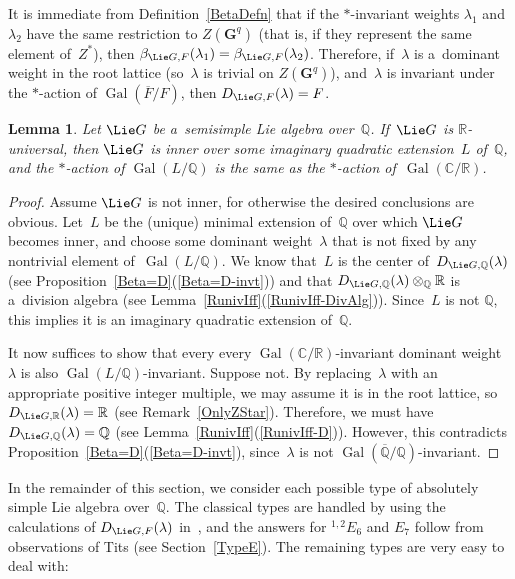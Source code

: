 \documentclass[pdftex]{sigma}
\DeclareMathOperator{\Gal}{Gal}
\numberwithin{equation}{section}
\newtheorem{lem}[prop]{Lemma}
{\theoremstyle{definition}
\newtheorem{defn}[prop]{Definition}
\newtheorem{notation}[prop]{Notation}
\newtheorem{rem}[prop]{Remark}
\newtheorem{ques}[prop]{Question}
\newtheorem{eg}[prop]{Example}
\newtheorem{erratum}[prop]{Erratum}}
\begin{document}
\begin{rem}
\label{OnlyZStar}
It is immediate from Def\/inition~\ref{BetaDefn} that if the $*$-invariant weights $\lambda_1$ and $\lambda_2$ have the same
restriction to $Z(\mathbf{G}^q)$ (that is, if they represent the same element of~$Z^*$), then $\beta_{\Lie G,
F}(\lambda_1) = \beta_{\Lie G, F}(\lambda_2)$.
Therefore, if~$\lambda$ is a~dominant weight in the root lattice (so~$\lambda$ is trivial on $Z(\mathbf{G}^q)$),
and~$\lambda$ is invariant under the $*$-action of $\Gal(\overline{F}/F)$, then $D_{\Lie G, F}(\lambda) = F$.
\end{rem}

\begin{lem}
\label{SameFixed}
Let  $\Lie G$ be a~semisimple Lie algebra over~$\mathbb{Q}$.
If~$\Lie G$ is $\mathbb{R}$-universal, then $\Lie G$ is inner over some imaginary quadratic extension~$L$
of~$\mathbb{Q}$, and the $*$-action of $\Gal(L/\mathbb{Q})$ is the same as the $*$-action of~$\Gal(\mathbb{C}/\mathbb{R})$.
\end{lem}

\begin{proof}
Assume $\Lie G$ is not inner, for otherwise the desired conclusions are obvious.
Let~$L$ be the (unique) minimal extension of~$\mathbb{Q}$ over which $\Lie G$ becomes inner, and choose some dominant
weight~$\lambda$ that is not f\/ixed by any nontrivial element of~$\Gal(L/\mathbb{Q})$.
We know that~$L$ is the center of~$D_{\Lie G, \mathbb{Q}}(\lambda)$ (see Proposition~\ref{Beta=D}(\ref{Beta=D-invt})) and that $D_{\Lie
G, \mathbb{Q}}(\lambda) \otimes_\mathbb{Q} \mathbb{R}$ is a~division algebra (see Lemma~\ref{RunivIff}(\ref{RunivIff-DivAlg})).
Since~$L$ is not $\mathbb{Q}$, this implies it is an imaginary quadratic extension of~$\mathbb{Q}$.

It now suf\/f\/ices to show that every every $\Gal(\mathbb{C}/\mathbb{R})$-invariant dominant weight~$\lambda$ is also
$\Gal(L/\mathbb{Q})$-invariant.
Suppose not.
By replacing~$\lambda$ with an appropriate positive integer multiple, we may assume it is in the root lattice, so
$D_{\Lie G,\mathbb{R}}(\lambda) = \mathbb{R}$ (see Remark~\ref{OnlyZStar}).
Therefore, we must have $D_{\Lie G,\mathbb{Q}}(\lambda) = \mathbb{Q}$ (see Lemma~\ref{RunivIff}(\ref{RunivIff-D})).
However, this contradicts Proposition~\ref{Beta=D}(\ref{Beta=D-invt}), since~$\lambda$ is not
$\Gal(\overline{\mathbb{Q}}/\mathbb{Q})$-invariant.
\end{proof}

In the remainder of this section, we consider each possible type of absolutely simple Lie algebra over~$\mathbb{Q}$.
The classical types are handled by using the calculations of $D_{\Lie G,F}(\lambda)$ in~\cite[\S~27B,
pp.~378--379]{KnusEtAl-BookOfInvols}, and the answers for ${}^{1,2} E_6$ and $E_7$ follow from observations of Tits
(see Section~\ref{TypeE}).
The remaining types are very easy to deal with:
\end{document}
